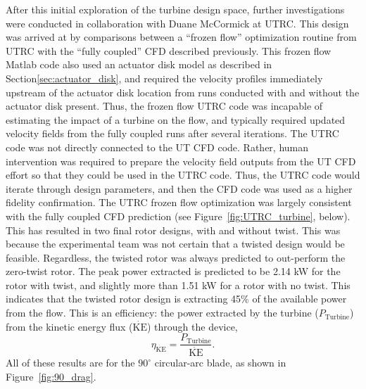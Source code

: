 After this initial exploration of the turbine design space, further
investigations were conducted in collaboration with Duane McCormick at
UTRC. This design was arrived at by comparisons between a ``frozen
flow'' optimization routine from UTRC  with the ``fully coupled'' CFD
described previously. This frozen 
flow Matlab code also used an actuator disk model as described in 
Section\ref{sec:actuator_disk}, and required the velocity profiles
immediately upstream of the actuator disk location from runs conducted
with and without the actuator disk present. Thus, the frozen flow
UTRC code was incapable of estimating the impact of a turbine on the
flow, and typically required updated velocity fields from the fully
coupled runs after several iterations. 
The UTRC code was not directly connected to the UT CFD code. Rather,
human intervention was required to prepare the velocity field outputs
from the UT CFD effort so that they could be used in the UTRC
code. Thus, the UTRC code would iterate through design parameters, and
then the CFD code was used as a higher fidelity confirmation. The UTRC
frozen flow optimization was largely consistent with the fully coupled
CFD prediction (see  Figure~\ref{fig:UTRC_turbine}, below). This has
resulted in two final rotor designs, with and without twist. This was
because the experimental team was not certain that a twisted design
would be feasible. Regardless, the twisted rotor was always predicted to 
out-perform the zero-twist rotor.  
The peak power extracted is predicted to be 2.14 kW for the rotor
with twist, and slightly more than 1.51 kW for a rotor with no twist. 
%
%
This indicates that the twisted rotor design is extracting 45\% of the
available power from the flow. This is an efficiency: the power
extracted by the turbine ($P_{\text{Turbine}}$) from the kinetic energy
flux ($\dot{\text{KE}}$) through the device, 
\begin{equation}
\eta_{\dot{\text{KE}}} = \frac{P_{\text{Turbine}}}{\dot{\text{KE}}}. 
\end{equation}
All of these results are for the $90^{\circ}$ circular-arc
blade, as shown in Figure~\ref{fig:90_drag}. 

